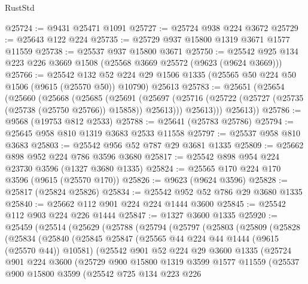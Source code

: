 \begin{lexlean}{RustStd}
\begin{coremodule}
@25724 := @9431 @25471 @1091
@25727 := @25724 @938 @224 @3672
@25729 := @25643 @122 @224
@25735 := @25729 @937 @15800 @1319 @3671 @1577 @11559
@25738 := @25537 @937 @15800 @3671
@25750 := @25542 @925 @134 @223 @226 @3669 @1508 (@25568 @3669 @25572 (@9623 (@9624 @3669)))
@25766 := @25542
    @132
    @52
    @224
    @29
    @1506
    @1335
    (@25565 @50 @224 @50 @1506 (@9615 (@25570 @50)) @10790)
    @25613
@25783 := @25651
    (@25654
      (@25660
        (@25668
          (@25685
            (@25691
              (@25697 (@25716 (@25722 (@25727 (@25735 (@25738 (@25750 @25766)) @15858)) @25613)))
              @25613)))
        @25613))
@25786 := @9568 (@19753 @812 @2533)
@25788 := @25641 (@25783 @25786)
@25794 := @25645 @958 @810 @1319 @3683 @2533 @11558
@25797 := @25537 @958 @810 @3683
@25803 := @25542 @956 @52 @787 @29 @3681 @1335
@25809 := @25662 @898 @952 @224 @786 @3596 @3680
@25817 := @25542 @898 @954 @224 @23730 @3596 (@1327 @3680 @1335)
@25824 := @25565 @170 @224 @170 @3596 (@9615 (@25570 @170))
@25826 := @9623 (@9624 @3596)
@25828 := @25817 (@25824 @25826)
@25834 := @25542 @952 @52 @786 @29 @3680 @1335
@25840 := @25662 @112 @901 @224 @224 @1444 @3600
@25845 := @25542 @112 @903 @224 @226 @1444
@25847 := @1327 @3600 @1335
@25920 := @25459
    (@25514
      (@25629
        (@25788
          (@25794
            (@25797
              (@25803
                (@25809
                  (@25828
                    (@25834
                      (@25840
                        (@25845
                          @25847
                          (@25565 @44 @224 @44 @1444 (@9615 (@25570 @44)) @10581)
                          (@25542
                            @901
                            @52
                            @224
                            @29
                            @3600
                            @1335
                            (@25724
                              @901
                              @224
                              @3600
                              (@25729
                                @900
                                @15800
                                @1319
                                @3599
                                @1577
                                @11559
                                (@25537
                                  @900
                                  @15800
                                  @3599
                                  (@25542
                                    @725
                                    @134
                                    @223
                                    @226

\end{coremodule}
\end{lexlean}
